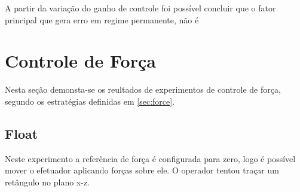 A partir da variação do ganho de controle foi possível concluir que o fator principal que gera erro em regime permanente, não é 
\section{Controle de Força}

Nesta seção demonsta-se os reultados de experimentos de controle de força, segundo os estratégias definidas em \ref{sec:force}. 

\subsection{Float}
Neste experimento a referência de força é configurada para zero, logo é possível mover o efetuador aplicando forças sobre ele. O operador tentou traçar um retângulo no plano x-z.

